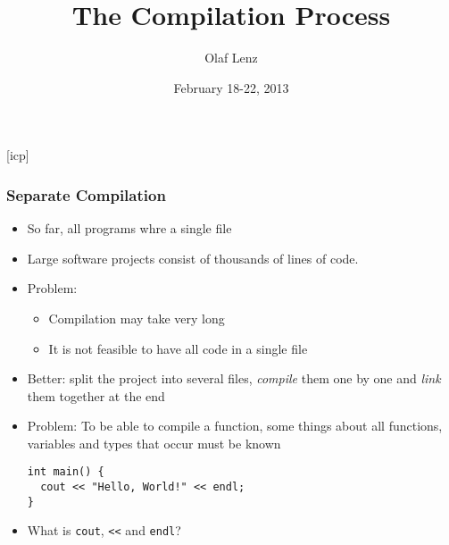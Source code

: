 \documentclass{slides}
\begin{document}
\graphicspath{{figures/}}

\title[The Compilation Process]{\Large The Compilation Process}

\author[O. Lenz]{Olaf Lenz} 
\date{February 18-22, 2013}

\begin{frame}
  \titlepage
\end {frame}
[icp]

\begin{frame}[fragile]
  \frametitle{Separate Compilation}
  \begin{itemize}
  \item So far, all programs whre a single file
  \item Large software projects consist of thousands of lines of
    code.
  \item Problem:
    \begin{itemize}
    \item Compilation may take very long
    \item It is not feasible to have all code in a single file
    \end{itemize}
  \item Better: split the project into several files, \emph{compile}
    them one by one and \emph{link} them together at the end
  \item Problem: To be able to compile a function, some things about
    all functions, variables and types that occur must be known
    \begin{lstlisting}
int main() {
  cout << "Hello, World!" << endl;
}    
\end{lstlisting}
    \item What is \lstinline!cout!, \lstinline!<<! and \lstinline!endl!?
  \end{itemize}
  
\end{frame}
\end{document}
